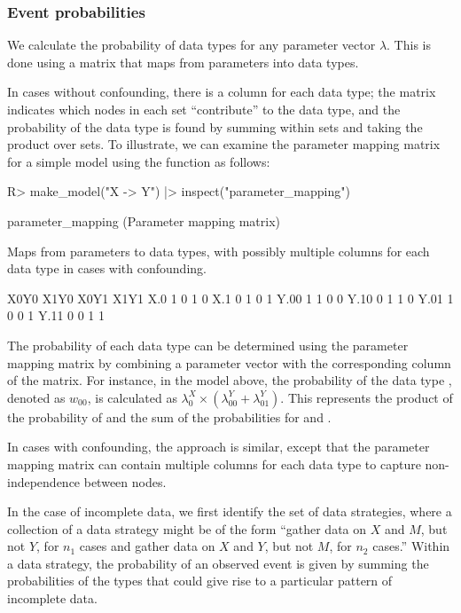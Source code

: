 \documentclass[
  11pt,
  article]{jss}
\renewcommand{\texttt}[1]{\code{#1}}
\begin{document}
\subsubsection{Event probabilities}\label{event-probabilities}

We calculate the probability of data types for any parameter vector
\(\lambda\). This is done using a matrix that maps from parameters into
data types.

In cases without confounding, there is a column for each data type; the
matrix indicates which nodes in each set ``contribute'' to the data
type, and the probability of the data type is found by summing within
sets and taking the product over sets. To illustrate, we can examine the
parameter mapping matrix for a simple model using the \texttt{inspect()}
function as follows:

\begin{CodeChunk}
\begin{CodeInput}
R> make_model("X -> Y") |> inspect("parameter_mapping")
\end{CodeInput}

\begin{CodeOutput}

parameter_mapping (Parameter mapping matrix)

  Maps from parameters to data types, with
  possibly multiple columns for each data type
  in cases with confounding.

     X0Y0 X1Y0 X0Y1 X1Y1
X.0     1    0    1    0
X.1     0    1    0    1
Y.00    1    1    0    0
Y.10    0    1    1    0
Y.01    1    0    0    1
Y.11    0    0    1    1
\end{CodeOutput}
\end{CodeChunk}

The probability of each data type can be determined using the parameter
mapping matrix by combining a parameter vector with the corresponding
column of the matrix. For instance, in the model above, the probability
of the data type \texttt{X0Y0}, denoted as \(w_{00}\), is calculated as
\(\lambda^X_0 \times (\lambda^Y_{00} + \lambda^Y_{01})\). This
represents the product of the probability of \texttt{X.0} and the sum of
the probabilities for \texttt{Y.00} and \texttt{Y.01}.

In cases with confounding, the approach is similar, except that the
parameter mapping matrix can contain multiple columns for each data type
to capture non-independence between nodes.

In the case of incomplete data, we first identify the set of data
strategies, where a collection of a data strategy might be of the form
``gather data on \(X\) and \(M\), but not \(Y\), for \(n_1\) cases and
gather data on \(X\) and \(Y\), but not \(M\), for \(n_2\) cases.''
Within a data strategy, the probability of an observed event is given by
summing the probabilities of the types that could give rise to a
particular pattern of incomplete data.
\end{document}
